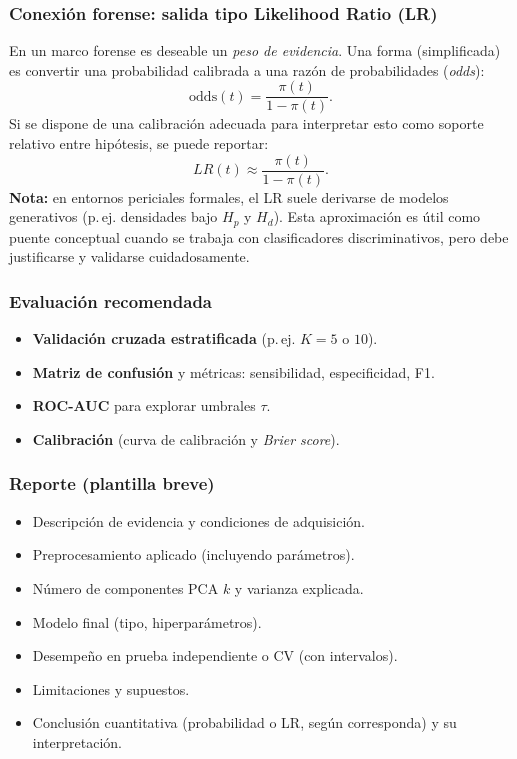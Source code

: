 \documentclass[a4paper,10pt,oneside]{article}
\begin{document}
\subsubsection*{Conexi\'on forense: salida tipo Likelihood Ratio (LR)}
En un marco forense es deseable un \textit{peso de evidencia}. Una forma (simplificada) es convertir una probabilidad calibrada a una raz\'on de probabilidades (\textit{odds}):
\[
\text{odds}(t)=\frac{\pi(t)}{1-\pi(t)}.
\]
Si se dispone de una calibraci\'on adecuada para interpretar esto como soporte relativo entre hip\'otesis, se puede reportar:
\[
LR(t)\approx \frac{\pi(t)}{1-\pi(t)}.
\]
\textbf{Nota:} en entornos periciales formales, el LR suele derivarse de modelos generativos (p.\,ej. densidades bajo $H_p$ y $H_d$). Esta aproximaci\'on es \'util como puente conceptual cuando se trabaja con clasificadores discriminativos, pero debe justificarse y validarse cuidadosamente.

\subsubsection*{Evaluaci\'on recomendada}
\begin{itemize}
\item \textbf{Validaci\'on cruzada estratificada} (p.\,ej. $K=5$ o $10$).
\item \textbf{Matriz de confusi\'on} y m\'etricas: sensibilidad, especificidad, F1.
\item \textbf{ROC-AUC} para explorar umbrales $\tau$.
\item \textbf{Calibraci\'on} (curva de calibraci\'on y \textit{Brier score}).
\end{itemize}

\subsubsection*{Reporte (plantilla breve)}
\begin{itemize}
\item Descripci\'on de evidencia y condiciones de adquisici\'on.
\item Preprocesamiento aplicado (incluyendo par\'ametros).
\item N\'umero de componentes PCA $k$ y varianza explicada.
\item Modelo final (tipo, hiperpar\'ametros).
\item Desempe\~no en prueba independiente o CV (con intervalos).
\item Limitaciones y supuestos.
\item Conclusi\'on cuantitativa (probabilidad o LR, seg\'un corresponda) y su interpretaci\'on.
\end{itemize}
\end{document}
